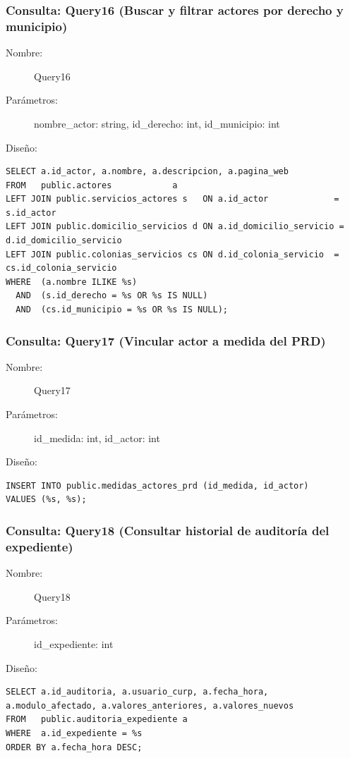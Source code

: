 \subsubsection{Consulta: Query16 (Buscar y filtrar actores por derecho y municipio)}
\begin{description}
    \item[Nombre:] Query16
    \item[Parámetros:] nombre\_actor: string, id\_derecho: int, id\_municipio: int
    \item[Diseño:] \cdtEmpty
\end{description}
\begin{verbatim}
SELECT a.id_actor, a.nombre, a.descripcion, a.pagina_web
FROM   public.actores            a
LEFT JOIN public.servicios_actores s   ON a.id_actor             = s.id_actor
LEFT JOIN public.domicilio_servicios d ON a.id_domicilio_servicio = d.id_domicilio_servicio
LEFT JOIN public.colonias_servicios cs ON d.id_colonia_servicio  = cs.id_colonia_servicio
WHERE  (a.nombre ILIKE %s)
  AND  (s.id_derecho = %s OR %s IS NULL)
  AND  (cs.id_municipio = %s OR %s IS NULL);
\end{verbatim}

\subsubsection{Consulta: Query17 (Vincular actor a medida del PRD)}
\begin{description}
    \item[Nombre:] Query17
    \item[Parámetros:] id\_medida: int, id\_actor: int
    \item[Diseño:] \cdtEmpty
\end{description}
\begin{verbatim}
INSERT INTO public.medidas_actores_prd (id_medida, id_actor)
VALUES (%s, %s);
\end{verbatim}

\subsubsection{Consulta: Query18 (Consultar historial de auditoría del expediente)}
\begin{description}
    \item[Nombre:] Query18
    \item[Parámetros:] id\_expediente: int
    \item[Diseño:] \cdtEmpty
\end{description}
\begin{verbatim}
SELECT a.id_auditoria, a.usuario_curp, a.fecha_hora, a.modulo_afectado, a.valores_anteriores, a.valores_nuevos
FROM   public.auditoria_expediente a
WHERE  a.id_expediente = %s
ORDER BY a.fecha_hora DESC;
\end{verbatim}

